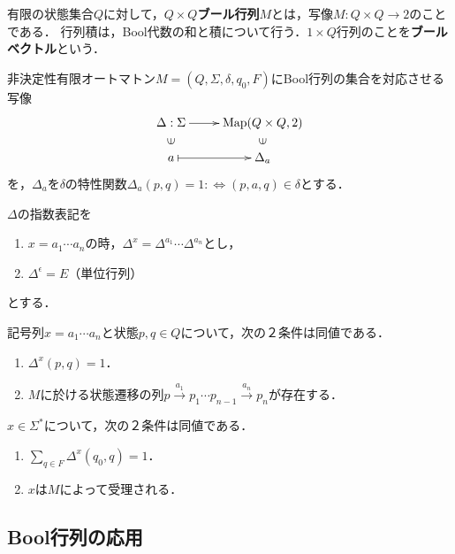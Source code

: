 \documentclass[uplatex, dvipdfmx]{jsreport}
\begin{document}
\begin{definition}
    有限の状態集合$Q$に対して，\textbf{$Q\times Q$ブール行列}$M$とは，写像$M:Q\times Q\to 2$のことである．
    行列積は，Bool代数の和と積について行う．$1\times Q$行列のことを\textbf{ブールベクトル}という．
\end{definition}

\begin{definition}
    非決定性有限オートマトン$M=(Q,\Sigma,\delta,q_0,F)$にBool行列の集合を対応させる写像
    \[ \xymatrix@R-2pc{
        \Delta:\Sigma\ar[r]&\Map(Q\times Q,2)\\
        \rotatebox[origin=c]{90}{$\in$}&\rotatebox[origin=c]{90}{$\in$}\\
        a\ar@{|->}[r]&\Delta_a
    } \]
    を，$\Delta_a$を$\delta$の特性関数$\Delta_a(p,q)=1:\Leftrightarrow (p,a,q)\in\delta$とする．

    $\Delta$の指数表記を
    \begin{enumerate}
        \item $x=a_1\cdots a_n$の時，$\Delta^x=\Delta^{a_1}\cdots\Delta^{a_n}$とし，
        \item $\Delta^\epsilon=E$（単位行列）
    \end{enumerate}
    とする．
\end{definition}

\begin{proposition}
    記号列$x=a_1\cdots a_n$と状態$p,q\in Q$について，次の２条件は同値である．
    \begin{enumerate}
        \item $\Delta^x(p,q)=1$．
        \item $M$に於ける状態遷移の列$p\xrightarrow{a_1}p_1\cdots  p_{n-1}\xrightarrow{a_n}p_n$が存在する．
    \end{enumerate}
\end{proposition}

\begin{corollary}
    $x\in\Sigma^*$について，次の２条件は同値である．
    \begin{enumerate}
        \item $\sum_{q\in F}\Delta^x(q_0,q)=1$．
        \item $x$は$M$によって受理される．
    \end{enumerate}
\end{corollary}

\subsection{Bool行列の応用}
\end{document}
